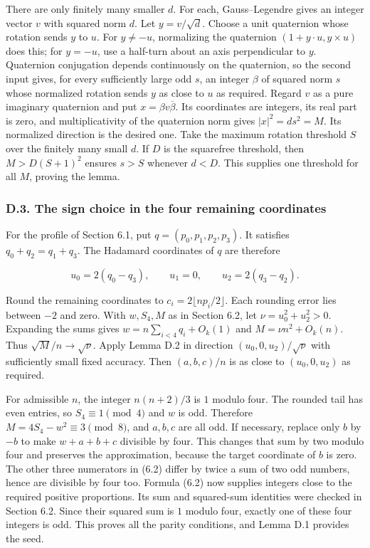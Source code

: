\documentclass[english,11pt,a4paper]{article}
\begin{document}
There are only finitely many smaller \(d\). For each, Gauss--Legendre gives an integer vector \(v\) with squared norm \(d\). Let \(y=v/\sqrt d\). Choose a unit quaternion whose rotation sends \(y\) to \(u\). For \(y\ne-u\), normalizing the quaternion \((1+y\cdot u,y\times u)\) does this; for \(y=-u\), use a half-turn about an axis perpendicular to \(y\). Quaternion conjugation depends continuously on the quaternion, so the second input gives, for every sufficiently large odd \(s\), an integer \(\beta\) of squared norm \(s\) whose normalized rotation sends \(y\) as close to \(u\) as required. Regard \(v\) as a pure imaginary quaternion and put \(x=\beta v\overline\beta\). Its coordinates are integers, its real part is zero, and multiplicativity of the quaternion norm gives \(|x|^2=d s^2=M\). Its normalized direction is the desired one. Take the maximum rotation threshold \(S\) over the finitely many small \(d\). If \(D\) is the squarefree threshold, then \(M>D(S+1)^2\) ensures \(s>S\) whenever \(d<D\). This supplies one threshold for all \(M\), proving the lemma.

\subsubsection{D.3. The sign choice in the four remaining coordinates}\label{d.3.-the-sign-choice-in-the-four-remaining-coordinates}

For the profile of Section 6.1, put \(q=(p_0,p_1,p_2,p_3)\). It satisfies \(q_0+q_2=q_1+q_3\). The Hadamard coordinates of \(q\) are therefore

\[u_0=2(q_0-q_3),\qquad u_1=0,\qquad u_2=2(q_3-q_2).\]

Round the remaining coordinates to \(c_i=2\lfloor np_i/2\rfloor\). Each rounding error lies between \(-2\) and zero. With \(w,S_4,M\) as in Section 6.2, let \(\nu=u_0^2+u_2^2>0\). Expanding the sums gives \(w=n\sum_{i<4}q_i+O_k(1)\) and \(M=\nu n^2+O_k(n)\). Thus \(\sqrt M/n\to\sqrt \nu\). Apply Lemma D.2 in direction \((u_0,0,u_2)/\sqrt \nu\) with sufficiently small fixed accuracy. Then \((a,b,c)/n\) is as close to \((u_0,0,u_2)\) as required.

For admissible \(n\), the integer \(n(n+2)/3\) is \(1\) modulo four. The rounded tail has even entries, so \(S_4\equiv1\pmod4\) and \(w\) is odd. Therefore \(M=4S_4-w^2\equiv3\pmod8\), and \(a,b,c\) are all odd. If necessary, replace only \(b\) by \(-b\) to make \(w+a+b+c\) divisible by four. This changes that sum by two modulo four and preserves the approximation, because the target coordinate of \(b\) is zero. The other three numerators in (6.2) differ by twice a sum of two odd numbers, hence are divisible by four too. Formula (6.2) now supplies integers close to the required positive proportions. Its sum and squared-sum identities were checked in Section 6.2. Since their squared sum is \(1\) modulo four, exactly one of these four integers is odd. This proves all the parity conditions, and Lemma D.1 provides the seed.
\end{document}
